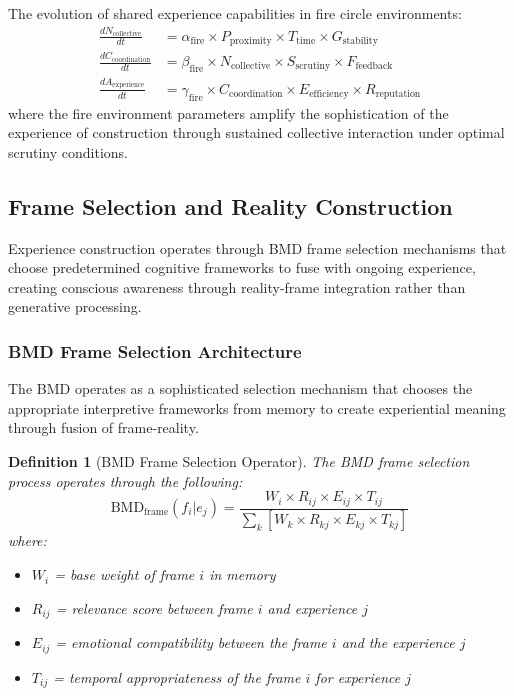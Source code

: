 \documentclass{article}
\newtheorem{definition}[theorem]{Definition}
\begin{document}
The evolution of shared experience capabilities in fire circle environments:
\begin{align}
\frac{dN_{\text{collective}}}{dt} &= \alpha_{\text{fire}} \times P_{\text{proximity}} \times T_{\text{time}} \times G_{\text{stability}} \\
\frac{dC_{\text{coordination}}}{dt} &= \beta_{\text{fire}} \times N_{\text{collective}} \times S_{\text{scrutiny}} \times F_{\text{feedback}} \\
\frac{dA_{\text{experience}}}{dt} &= \gamma_{\text{fire}} \times C_{\text{coordination}} \times E_{\text{efficiency}} \times R_{\text{reputation}}
\end{align}
where the fire environment parameters amplify the sophistication of the experience of construction through sustained collective interaction under optimal scrutiny conditions.

\subsection{Frame Selection and Reality Construction}

Experience construction operates through BMD frame selection mechanisms that choose predetermined cognitive frameworks to fuse with ongoing experience, creating conscious awareness through reality-frame integration rather than generative processing.

\subsubsection{BMD Frame Selection Architecture}

The BMD operates as a sophisticated selection mechanism that chooses the appropriate interpretive frameworks from memory to create experiential meaning through fusion of frame-reality.

\begin{definition}[BMD Frame Selection Operator]
The BMD frame selection process operates through the following:
\begin{equation}
\text{BMD}_{\text{frame}}(f_i | e_j) = \frac{W_i \times R_{ij} \times E_{ij} \times T_{ij}}{\sum_k[W_k \times R_{kj} \times E_{kj} \times T_{kj}]}
\end{equation}
where:
\begin{itemize}
\item $W_i$ = base weight of frame $i$ in memory
\item $R_{ij}$ = relevance score between frame $i$ and experience $j$  
\item $E_{ij}$ = emotional compatibility between the frame $i$ and the experience $j$
\item $T_{ij}$ = temporal appropriateness of the frame $i$ for experience $j$
\end{itemize}
\end{definition}
\end{document}
